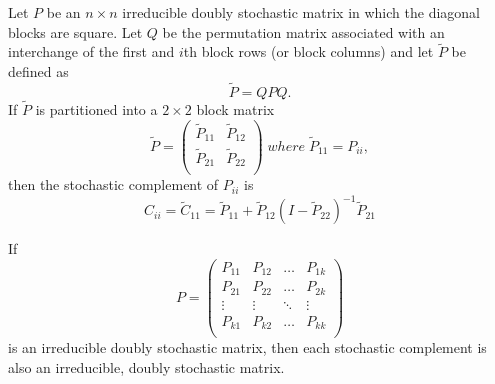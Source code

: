 \documentclass[final]{siamltex}
\begin{document}
\begin{lemma} \label{lemmaone} Let $P$ be an $n \times n$ irreducible doubly stochastic matrix in which the diagonal blocks are square. Let $Q$ be the permutation matrix associated with an interchange of the first and $i$th block rows (or block columns) and let $\tilde{P}$ be defined as
$$ \tilde{P} = QPQ.$$
If $\tilde{P}$ is partitioned into a $2 \times 2$ block matrix
\begin{equation} \label{twobytwo}
\tilde{P} = \left(
\begin{array}{cc}
\tilde{P}_{11}  & \tilde{P}_{12}    \\
\tilde{P}_{21}  & \tilde{P}_{22}  \\
\end{array}
\right)
\; where \; \tilde{P}_{11}=P_{ii},
\end{equation}
then the stochastic complement of $P_{ii}$ is
\begin{equation}
C_{ii}=\tilde{C}_{11}=\tilde{P}_{11}+\tilde{P}_{12} \left(I- \tilde{P}_{22}\right)^{-1}\tilde{P}_{21}
\end{equation}
\end{lemma}

\begin{theorem} If
 \[ P=
\left(
\begin{array}{cccc}
P_{11}  & P_{12}   & \dots & P_{1k}    \\
P_{21}  & P_{22}   & \dots & P_{2k}    \\
\vdots   & \vdots   & \ddots & \vdots \\
P_{k1}  & {P}_{k2}   & \dots & P_{kk}    \\ 
\end{array}
\right)
\]
is an irreducible doubly stochastic matrix, then each stochastic complement is also an irreducible, doubly stochastic matrix.
\end{theorem}
\end{document}
